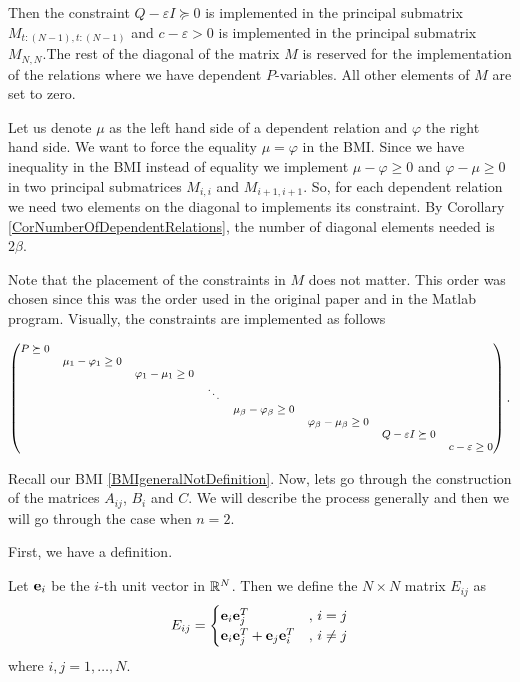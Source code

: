 \documentclass[a4paper,12pt,twoside,BCOR=10mm]{scrbook}
\begin{document}
Then the constraint $Q - \varepsilon I\succeq 0$ is implemented in the principal submatrix $M_{t:(N-1), t:(N-1)}$ and $c - \varepsilon > 0$ is implemented in the principal submatrix $M_{N,N}$.The rest of the diagonal of the matrix $M$ is reserved for the implementation of the relations where we have dependent $P$-variables. All other elements of $M$ are set to zero.

Let us denote $\mu$ as the left hand side of a dependent relation and $\varphi$ the right hand side. We want to force the equality $\mu = \varphi$ in the BMI. Since we have inequality in the BMI instead of equality we implement $\mu - \varphi \geq 0$ and $\varphi - \mu \geq 0$ in two principal submatrices $M_{i,i}$ and $M_{i+1,i+1}$. So, for each dependent relation we need two elements on the diagonal to implements its constraint. By Corollary \ref{CorNumberOfDependentRelations}, the number of diagonal elements needed is $2\beta$.

Note that the placement of the constraints in $M$ does not matter. This order was chosen since this was the order used in the original paper \citep{Ha2019BMI} and in the Matlab program. Visually, the constraints are implemented as follows

\begin{align*}
\footnotesize{
    \begin{pmatrix}
    P \succeq 0 & & & & & & &\\
      & \mu_1 - \varphi_1 \geq 0 & & & & & &\\
      & & \varphi_1 - \mu_1 \geq 0 & & & & &\\
      & & & \ddots & & & &\\
      & & & & \mu_\beta - \varphi_\beta \geq 0 & & &\\
      & & & & & \varphi_\beta - \mu_\beta \geq 0 & &\\
      & & & & & & Q - \varepsilon I \succeq 0 &\\
      & & & & & & & c - \varepsilon \geq 0
    \end{pmatrix}.
    }
\end{align*}

Recall our BMI \eqref{BMIgeneralNotDefinition}. Now, lets go through the construction of the matrices $A_{ij}$, $B_i$ and $C$. We will describe the process generally and then we will go through the case when $n = 2$.

First, we have a definition.
\begin{definition}
Let $\mathbf{e}_i$ be the $i$-th unit vector in $\mathbb{R}^{N}$. Then we define the $N\times N$ matrix $E_{ij}$ as
\begin{align*}
    E_{ij} = \begin{cases}
    \mathbf{e}_i \mathbf{e}_j^T &,\, i = j\\
    \mathbf{e}_i \mathbf{e}_j^T + \mathbf{e}_j \mathbf{e}_i^T &,\, i \neq j 
    \end{cases}
\end{align*}
where $i,j = 1, \ldots, N$.
\end{definition}
\end{document}
